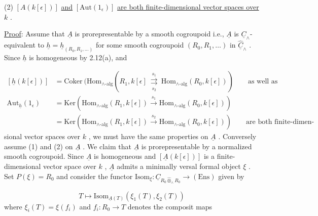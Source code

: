 (2)  $[A(k[\epsilon])]$  \underline{and}  $[\mathrm{Aut}(1_{\epsilon})]$  \underline{are both finite-dimensional vector spaces over}  $k$  .

\underline{Proof}:  Assume that  $\underline{A}$  is prorepresentable by a smooth cogroupoid i.e.,  $\underline{A}$  is  $\underline{C}_{\wedge}$-equivalent to  $\underline{h} = \underline{h}_{(R_{0},R_{1},\ldots)}$  for some smooth cogroupoid  $(R_{0},R_{1},\ldots)$  in  $\hat{\underline{C}}_{\wedge}$  . Since  $\underline{h}$  is homogeneous by 2.12(a), and

\begin{equation*}
\begin{aligned}
[\underline{h}(k[\epsilon])] &= \mathrm{Coker}\ (\mathrm{Hom}_{\wedge\text{-alg}}(R_{1},k[\epsilon] \ \underset{s_{2}}{\overset{s_{1}}{\rightrightarrows}}\ \mathrm{Hom}_{\wedge\text{-alg}}(R_{0},k[\epsilon])) \qquad \text{as well as} \\[2ex]
\mathrm{Aut}_{\underline{h}}(1_{\epsilon}) &= \mathrm{Ker}(\mathrm{Hom}_{\wedge\text{-alg}}(R_{1},k[\epsilon]) \xrightarrow{\ s_{1}\ } \mathrm{Hom}_{\wedge\text{-alg}}(R_{0},k[\epsilon])) \\[2ex]
&= \mathrm{Ker}(\mathrm{Hom}_{\wedge\text{-alg}}(R_{1},k[\epsilon]) \xrightarrow{\ s_{2}\ } \mathrm{Hom}_{\wedge\text{-alg}}(R_{0},k[\epsilon])) \qquad \text{are both finite-dimen-}
\end{aligned}
\end{equation*}
sional vector spaces over  $k$  , we must have the same properties on  $\underline{A}$  . Conversely assume (1) and (2) on  $\underline{A}$  . We claim that  $\underline{A}$  is prorepresentable by a normalized smooth cogroupoid. Since  $\underline{A}$  is homogeneous and  $[\underline{A}(k[\epsilon])]$  is a finite-dimensional vector space over  $k$  ,  $\underline{A}$  admits a minimally versal formal object  $\xi$  . Set  $P(\xi) = R_{0}$  and consider the functor  $\mathrm{Isom}_{\xi} : \underline{C}_{R_{0} \hat{\otimes}_{\wedge} R_{0}} \to (\mathrm{Ens})$  given by

\begin{equation*}
T \longmapsto \mathrm{Isom}_{\underline{A}(T)}(\xi_{1}(T),\xi_{2}(T))
\end{equation*}
where  $\xi_{i}(T) = \xi(f_{i})$  and  $f_{i} : R_{0} \to T$  denotes the composit maps

